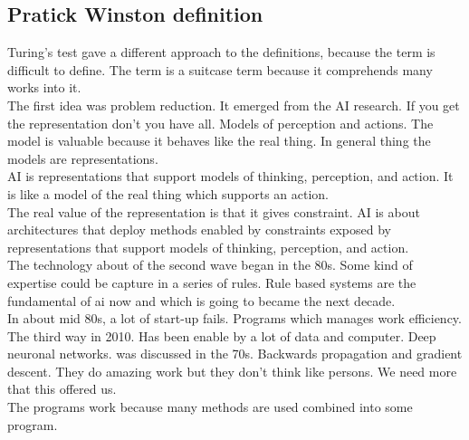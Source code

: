 \documentclass{article}
\begin{document}
	\subsection{Pratick Winston definition}
	Turing's test gave a different approach to the definitions, because the term is difficult to define.
	The term is a suitcase term because it comprehends many works into it.\\
	The first idea was problem reduction. It emerged from the AI research. If you get the representation don't you have all. Models of perception and actions. The model is valuable because it behaves like the real thing. In general thing the models are representations.\\ 
	AI is representations that support models of thinking, perception, and action. It is like a model of the real thing which supports an action.\\
	The real value of the representation is that it gives constraint. AI is about architectures that deploy methods enabled by constraints exposed by representations that support models of thinking, perception, and action.\\
	The technology about of the second wave began in the 80s. Some kind of expertise could be capture in a series of rules. Rule based systems are the fundamental of ai now and which is going to became the next decade.\\
	In about mid 80s, a lot of start-up fails. Programs which manages work efficiency. 
	The third way in 2010. Has been enable by a lot of data and computer. Deep neuronal networks. was discussed in the 70s. Backwards propagation and gradient descent. They do amazing work but they don't think like persons. We need more that this offered us.\\
	The programs work because many methods are used combined into some program.
	
\end{document}
